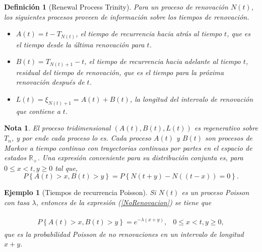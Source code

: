 \documentclass{article}
\newtheorem{Def}{Definición}[section]
\newtheorem{Ejem}{Ejemplo}[section]
\newtheorem{Note}{Nota}%
\newcommand{\rea}{\mathbb{R}}
\numberwithin{equation}{section}
\begin{document}
\begin{Def}[Renewal Process Trinity]
Para un proceso de renovaci\'on $N\left(t\right)$, los siguientes procesos proveen de informaci\'on sobre los tiempos de renovaci\'on.
\begin{itemize}
\item $A\left(t\right)=t-T_{N\left(t\right)}$, el tiempo de recurrencia hacia atr\'as al tiempo $t$, que es el tiempo desde la \'ultima renovaci\'on para $t$.

\item $B\left(t\right)=T_{N\left(t\right)+1}-t$, el tiempo de recurrencia hacia adelante al tiempo $t$, residual del tiempo de renovaci\'on, que es el tiempo para la pr\'oxima renovaci\'on despu\'es de $t$.

\item $L\left(t\right)=\xi_{N\left(t\right)+1}=A\left(t\right)+B\left(t\right)$, la longitud del intervalo de renovaci\'on que contiene a $t$.
\end{itemize}
\end{Def}

\begin{Note}
El proceso tridimensional $\left(A\left(t\right),B\left(t\right),L\left(t\right)\right)$ es regenerativo sobre $T_{n}$, y por ende cada proceso lo es. Cada proceso $A\left(t\right)$ y $B\left(t\right)$ son procesos de Markov a tiempo continuo con trayectorias continuas por partes en el espacio de estados $\rea_{+}$. Una expresi\'on conveniente para su distribuci\'on conjunta es, para $0\leq x<t,y\geq0$ tal que,
\begin{equation}\label{NoRenovacion}
P\left\{A\left(t\right)>x,B\left(t\right)>y\right\}=
P\left\{N\left(t+y\right)-N\left((t-x)\right)=0\right\}.
\end{equation}
\end{Note}

\begin{Ejem}[Tiempos de recurrencia Poisson]
Si $N\left(t\right)$ es un proceso Poisson con tasa $\lambda$, entonces de la expresi\'on (\ref{NoRenovacion}) se tiene que

\begin{eqnarray*}
\begin{array}{lc}
P\left\{A\left(t\right)>x,B\left(t\right)>y\right\}=e^{-\lambda\left(x+y\right)},&0\leq x<t,y\geq0,
\end{array}
\end{eqnarray*}
que es la probabilidad Poisson de no renovaciones en un intervalo de longitud $x+y$.
\end{Ejem}
\end{document}
